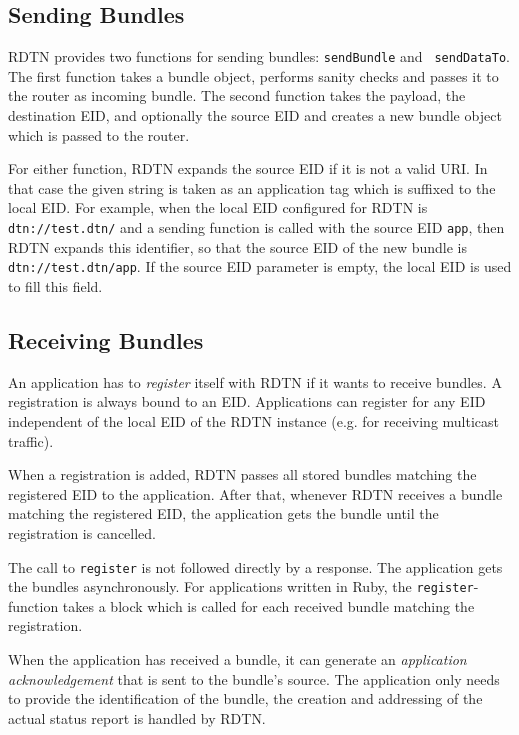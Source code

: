 \documentclass[a4paper]{article}
\begin{document}
\subsection{Sending Bundles}\label{sec.sending}

RDTN provides two functions for sending bundles: {\tt sendBundle} and {\tt
sendDataTo}. The first function takes a bundle object, performs sanity checks
and passes it to the router as incoming bundle. The second function takes the
payload, the destination EID, and optionally the source EID and creates a new
bundle object which is passed to the router.

For either function, RDTN expands the source EID if it is not a valid URI. In
that case the given string is taken as an application tag which is suffixed to
the local EID. For example, when the local EID configured for RDTN is {\tt
dtn://test.dtn/} and a sending function is called with the source EID {\tt app},
then RDTN expands this identifier, so that the source EID of the new bundle is
{\tt dtn://test.dtn/app}. If the source EID parameter is empty, the local EID is
used to fill this field.

\subsection{Receiving Bundles}\label{sec.receiving}

An application has to {\em register} itself with RDTN if it wants to receive
bundles. A registration is always bound to an
EID.  Applications can register for any EID independent of the local EID of the
RDTN instance (e.g. for receiving multicast traffic).

When a registration is added, RDTN passes all stored bundles matching the
registered EID to the application. After that, whenever RDTN receives a bundle 
matching the registered EID, the application gets the bundle until the 
registration is cancelled.

The call to {\tt register} is not followed directly by a response. The
application gets the bundles asynchronously. For applications written in Ruby,
the {\tt register}-function takes a block which is called for each received
bundle matching the registration.

When the application has received a bundle, it can generate an {\em application
acknowledgement} that is sent to the bundle's source. The application only needs
to provide the identification of the bundle, the creation and addressing of the
actual status report is handled by RDTN.
\end{document}
